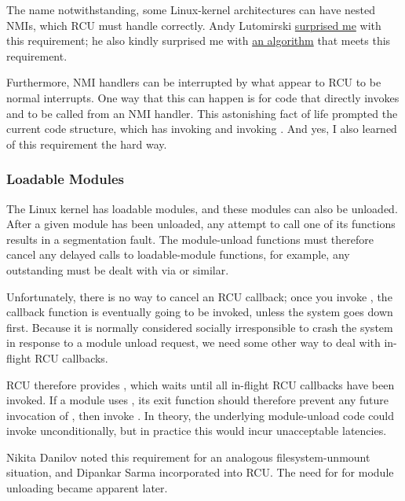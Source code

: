 The name notwithstanding, some Linux-kernel architectures can have
nested NMIs, which RCU must handle correctly. Andy Lutomirski
\href{https://lore.kernel.org/r/CALCETrXLq1y7e_dKFPgou-FKHB6Pu-r8+t-6Ds+8=va7anBWDA@mail.gmail.com}{surprised me}
with this requirement; he also kindly surprised me with
\href{https://lore.kernel.org/r/CALCETrXSY9JpW3uE6H8WYk81sg56qasA2aqmjMPsq5dOtzso=g@mail.gmail.com}{an algorithm}
that meets this requirement.

Furthermore, NMI handlers can be interrupted by what appear to RCU to be
normal interrupts.
One way that this can happen is for code that
directly invokes  and  to be called
from an NMI handler.
This astonishing fact of life prompted the current
code structure, which has  invoking
 and  invoking .
And yes, I also learned of this requirement the hard way.


\subsubsection{Loadable Modules}

The Linux kernel has loadable modules, and these modules can also be
unloaded.
After a given module has been unloaded, any attempt to call
one of its functions results in a segmentation fault.
The module-unload
functions must therefore cancel any delayed calls to loadable-module
functions, for example, any outstanding  must be dealt
with via  or similar.

Unfortunately, there is no way to cancel an RCU callback; once you
invoke , the callback function is eventually going to be
invoked, unless the system goes down first.
Because it is normally
considered socially irresponsible to crash the system in response to a
module unload request, we need some other way to deal with in-flight RCU
callbacks.

RCU therefore provides , which waits until all
in-flight RCU callbacks have been invoked.
If a module uses
, its exit function should therefore prevent any future
invocation of , then invoke .
In theory,
the underlying module-unload code could invoke 
unconditionally, but in practice this would incur unacceptable
latencies.

Nikita Danilov noted this requirement for an analogous
filesystem-unmount situation, and Dipankar Sarma incorporated
 into RCU\@.
The need for  for module
unloading became apparent later.


